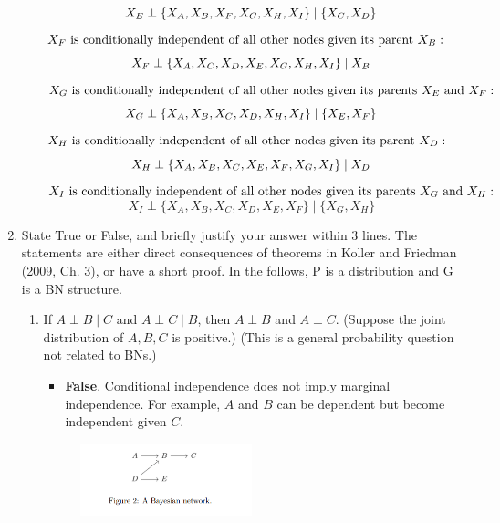 \documentclass[a3paper,12pt]{extarticle} %
\begin{document}
\begin{enumerate}
\begin{enumerate}
    \)
    \[
        X_E \perp \{X_A, X_B, X_F, X_G, X_H, X_I\} \mid \{X_C, X_D\} \\
    \]
    \(
        X_F \text{ is conditionally independent of all other nodes given its parent } X_B: \\
    \)
    \[
        X_F \perp \{X_A, X_C, X_D, X_E, X_G, X_H, X_I\} \mid X_B \\
    \]
    \(
        X_G \text{ is conditionally independent of all other nodes given its parents } X_E \text{ and } X_F: \\
    \)
    \[
        X_G \perp \{X_A, X_B, X_C, X_D, X_H, X_I\} \mid \{X_E, X_F\} \\
    \]
    \(
        X_H \text{ is conditionally independent of all other nodes given its parent } X_D: \\
    \)
    \[
        X_H \perp \{X_A, X_B, X_C, X_E, X_F, X_G, X_I\} \mid X_D \\
    \]
    \(
        X_I \text{ is conditionally independent of all other nodes given its parents } X_G \text{ and } X_H: \\
    \)
    \[
        X_I \perp \{X_A, X_B, X_C, X_D, X_E, X_F\} \mid \{X_G, X_H\}
    \]
\end{enumerate}
\item  State True or False, and briefly justify your answer within 3 lines. The statements are either
direct consequences of theorems in Koller and Friedman (2009, Ch. 3), or have a short proof. In the
follows, P is a distribution and G is a BN structure.
\begin{enumerate}
    \item If \( A \perp B \mid C \) and \( A \perp C \mid B \), then \( A \perp B \) and \( A \perp C \). (Suppose the joint distribution of \( A, B, C \) is positive.) (This is a general probability question not related to BNs.)
    \begin{itemize}
        \item \textbf{False}. Conditional independence does not imply marginal independence. For example, \( A \) and \( B \) can be dependent but become independent given \( C \).
    \end{itemize}
    \begin{figure}[h]
        \centering
        \includegraphics[width=0.5\textwidth]{bn2.png}

\end{figure}
\end{enumerate}
\end{enumerate}
\end{document}
